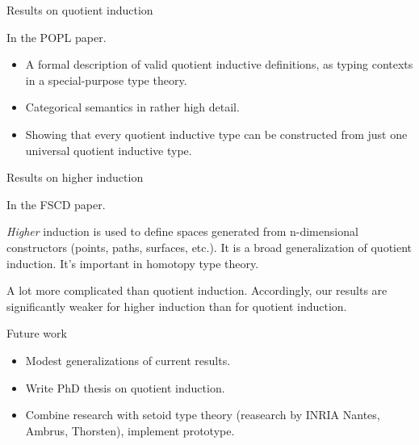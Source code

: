\documentclass[dvipsnames]{beamer}
\begin{document}
\begin{frame}{Results on quotient induction}

In the POPL paper.
\vspace{1em}

\begin{itemize}
\item A formal description of valid quotient inductive definitions,
      as typing contexts in a special-purpose type theory.
\item Categorical semantics in rather high detail.
\item Showing that every quotient inductive type can be constructed from just one universal quotient
      inductive type.
\end{itemize}

\end{frame}

\begin{frame}{Results on higher induction}

In the FSCD paper.
\vspace{1em}

\emph{Higher} induction is used to define spaces generated from n-dimensional
constructors (points, paths, surfaces, etc.).  It is a broad generalization of
quotient induction. It's important in homotopy type theory.
\vspace{1em}

A lot more complicated than quotient induction. Accordingly, our results are
significantly weaker for higher induction than for quotient induction.

\end{frame}

\begin{frame}{Future work}
  \begin{itemize}
  \item Modest generalizations of current results.
  \item Write PhD thesis on quotient induction.
  \item Combine research with setoid type theory (reasearch by INRIA Nantes, Ambrus, Thorsten), implement prototype.
  \end{itemize}

\end{frame}


\begin{frame}


\end{frame}
\end{document}

